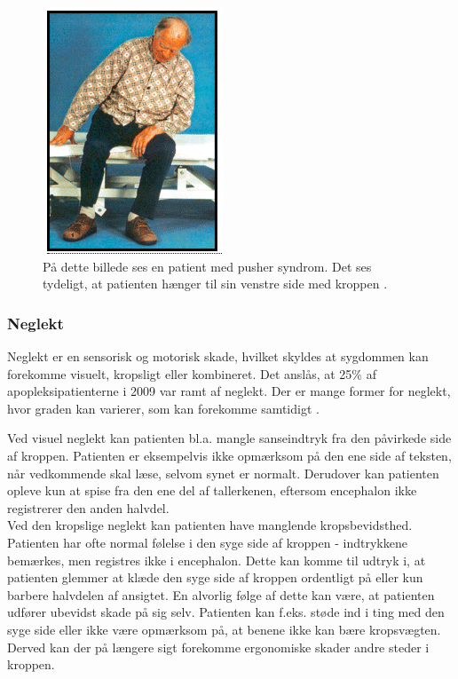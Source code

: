 \begin{figure}[H]
	\centering
	\includegraphics[scale=0.9]{figures/bProblemanalyse/Pusher.png}
	\caption{På dette billede ses en patient med pusher syndrom. Det ses tydeligt, at patienten hænger til sin venstre side med kroppen \cite{Karnath2003}.}
	\label{pusher}
\end{figure}

\subsubsection{Neglekt}
Neglekt er en sensorisk og motorisk skade, hvilket skyldes at sygdommen kan forekomme visuelt, kropsligt eller kombineret.  Det anslås, at 25\% af apopleksipatienterne i 2009 var ramt af neglekt. \cite{Sundhedsstyrelsen2009} Der er mange former for neglekt, hvor graden kan varierer, som kan forekomme samtidigt \cite{Sundhed.dk}.

Ved visuel neglekt kan patienten bl.a. mangle sanseindtryk fra den påvirkede side af kroppen. Patienten er eksempelvis ikke opmærksom på den ene side af teksten, når vedkommende skal læse, selvom synet er normalt. Derudover kan patienten opleve kun at spise fra den ene del af tallerkenen, eftersom encephalon ikke registrerer den anden halvdel. \cite{Sundhed.dk}\\
Ved den kropslige neglekt kan patienten have manglende kropsbevidsthed. Patienten har ofte normal følelse i den syge side af kroppen - indtrykkene bemærkes, men registres ikke i encephalon. Dette kan komme til udtryk i, at patienten glemmer at klæde den syge side af kroppen ordentligt på eller kun barbere halvdelen af ansigtet. En alvorlig følge af dette kan være, at patienten udfører ubevidst skade på sig selv. Patienten kan f.eks. støde ind i ting med den syge side eller ikke være opmærksom på, at benene ikke kan bære kropsvægten. Derved kan der på længere sigt forekomme ergonomiske skader andre steder i kroppen. \cite{Sundhed.dk}


